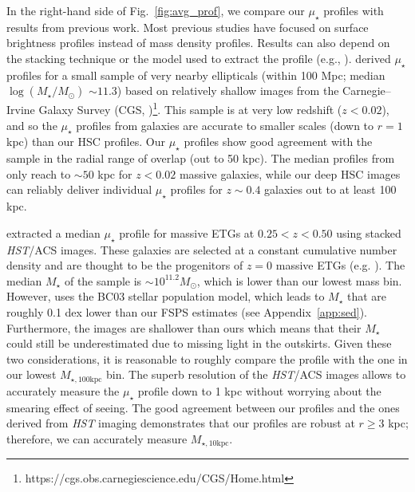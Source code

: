 \documentclass[fleqn,usenatbib]{mnras}
\def\mstar{{$M_{\star}$}}
\def\logms{{$\log (M_{\star}/M_{\odot})$}}
\def\minn{{$M_{\star,10\mathrm{kpc}}$}}
\def\mtot{{$M_{\star,100\mathrm{kpc}}$}}
\def\mden{{$\mu_{\star}$}}
\begin{document}
    In the right-hand side of Fig.~\ref{fig:avg_prof}, we compare our \mden{} 
    profiles with results from previous work. 
    Most previous studies have focused on surface brightness profiles instead 
    of mass density profiles.  
    Results can also depend on the stacking technique or the model used to extract 
    the profile (e.g., \citealt{Tal2011, DSouza2014}). 
    \citet{Huang2013a} derived \mden{} profiles for a small sample of very nearby 
    ellipticals (within 100 Mpc; median \logms{} ${\sim} 11.3$) based on relatively 
    shallow images from the Carnegie--Irvine Galaxy Survey 
    (CGS, \citealt{CGS1})\footnote{https://cgs.obs.carnegiescience.edu/CGS/Home.html}.  
    This sample is at very low redshift ($z<0.02$), and so the \mden{} profiles from 
    \citet{Huang2013a} galaxies are accurate to smaller scales (down to $r=1$ kpc) 
    than our HSC profiles.  
    Our \mden{} profiles show good agreement with the \citet{Huang2013a} sample in 
    the radial range of overlap (out to 50 kpc). 
    The median profiles from \citet{Huang2013a} only reach to ${\sim} 50$ kpc for 
    $z<0.02$ massive galaxies, while our deep HSC images can reliably deliver 
    individual \mden{} profiles for $z{\sim} 0.4$ galaxies out to at least 100 kpc. 
    
    \citet{Patel2013} extracted a median \mden{} profile for massive ETGs at 
    $0.25 < z < 0.50$ using stacked \textit{HST}/ACS images. 
    These galaxies are selected at a constant cumulative number density and are 
    thought to be the progenitors of $z=0$ massive ETGs (e.g. \citealt{Leja2013}).  
    The median \mstar{} of the \citet{Patel2013} sample is 
    ${\sim} 10^{11.2} M_{\odot}$, which is lower than our lowest mass bin. 
    However, \citet{Patel2013} uses the BC03 stellar population model, which leads to 
    \mstar{} that are roughly 0.1 dex lower than our FSPS estimates 
    (see Appendix~\ref{app:sed}). 
    Furthermore, the \citet{Patel2013} images are shallower than ours which means 
    that their \mstar{} could still be underestimated due to missing light in the 
    outskirts. 
    Given these two considerations, it is reasonable to roughly compare the 
    \citet{Patel2013} profile with the one in our lowest \mtot{} bin. 
    The superb resolution of the \textit{HST}/ACS images allows \citet{Patel2013} to 
    accurately measure the \mden{} profile down to 1 kpc without worrying about the
    smearing effect of seeing. 
    The good agreement between our profiles and the ones derived from \textit{HST} 
    imaging demonstrates that our profiles are robust at $r\geq 3$ kpc; therefore, 
    we can accurately measure \minn{}.
    
\end{document}
